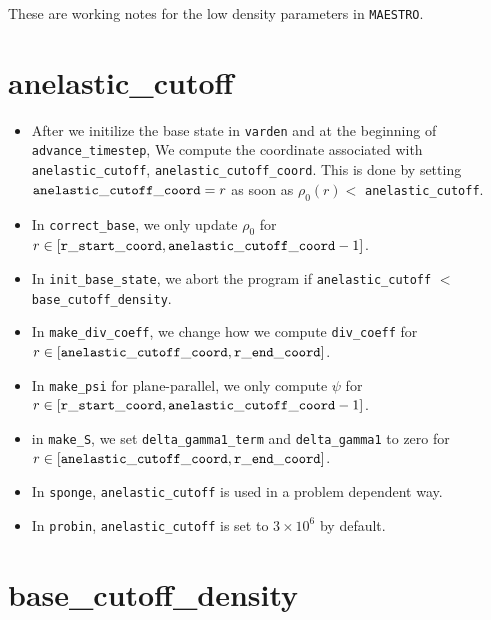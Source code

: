 These are working notes for the low density parameters in {\tt MAESTRO}.

\section{anelastic\_cutoff}

\begin{itemize}

\item After we initilize the base state in {\tt varden} and at the
  beginning of {\tt advance\_timestep}, We compute the coordinate
  associated with {\tt anelastic\_cutoff}, {\tt anelastic\_cutoff\_coord}.  
  This is done by setting ${\tt anelastic\_cutoff\_coord}= r$ as soon as 
  $\rho_0(r) <$ {\tt anelastic\_cutoff}.

\item In {\tt correct\_base}, we only update $\rho_0$ for 
  $r\in[{\tt r\_start\_coord},{\tt anelastic\_cutoff\_coord}-1]$.

\item In {\tt init\_base\_state}, we abort the program if 
  {\tt anelastic\_cutoff} $<$ {\tt base\_cutoff\_density}.

\item In {\tt make\_div\_coeff}, we change how we compute {\tt div\_coeff} 
  for $r\in[{\tt anelastic\_cutoff\_coord},{\tt r\_end\_coord}]$.

\item In {\tt make\_psi} for plane-parallel, we only compute $\psi$ for 
  $r\in[{\tt r\_start\_coord},{\tt anelastic\_cutoff\_coord}-1]$.

\item in {\tt make\_S}, we set {\tt delta\_gamma1\_term} and {\tt delta\_gamma1} 
  to zero for $r\in[{\tt anelastic\_cutoff\_coord},{\tt r\_end\_coord}]$.

\item In {\tt sponge}, {\tt anelastic\_cutoff} is used in a problem
  dependent way.

\item In {\tt probin}, {\tt anelastic\_cutoff} is set to $3\times 10^6$
  by default.

\end{itemize}

\section{base\_cutoff\_density}

